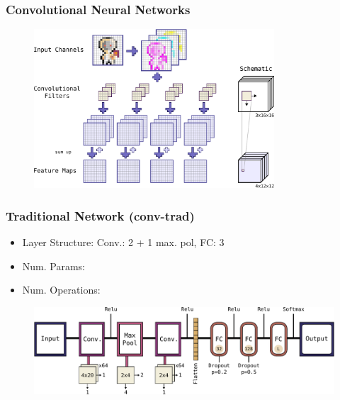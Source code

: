 \begin{frame}
  \frametitle{Convolutional Neural Networks}
  \begin{figure} \includegraphics[width=0.8\textwidth]{../4_nn/figs/nn_theory_cnn_basics.pdf} \end{figure}
\end{frame}

\begin{frame}
  \frametitle{Traditional Network (conv-trad)}
  \vspace{-0.5cm}
  \begin{itemize}
    \small
    \item Layer Structure: Conv.: 2 + 1 max. pol, FC: 3 
    \item Num. Params:
    \item Num. Operations: 
  \end{itemize}
  \begin{figure} \includegraphics[height=0.35\textheight]{../4_nn/figs/nn_arch_cnn_trad.pdf} \end{figure}
\end{frame}

